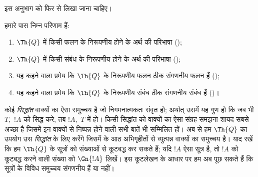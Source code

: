 \documentclass[../../../include/open-logic-section]{subfiles}
\begin{document}


\begin{editorial}
इस अनुभाग को फिर से लिखा जाना चाहिए।
\end{editorial}

हमारे पास निम्न परिणाम हैं:
\begin{enumerate}
\item $\Th{Q}$ में किसी फलन के निरूपणीय होने के अर्थ की परिभाषा
  ();
\item $\Th{Q}$ में किसी संबंध के निरूपणीय होने के अर्थ की परिभाषा
  ();
\item यह कहने वाला प्रमेय कि $\Th{Q}$ के निरूपणीय फलन ठीक संगणनीय फलन हैं
  ();
\item यह कहने वाला प्रमेय कि $\Th{Q}$ के निरूपणीय संबंध ठीक संगणनीय संबंध
  हैं ()।
\end{enumerate}

कोई {\em सिद्धांत} वाक्यों का ऐसा समुच्चय है जो निगमनात्मकतः संवृत हो;
अर्थात् उसमें यह गुण हो कि जब भी $T$,~$!A$ को सिद्ध करे, तब $!A$,~$T$ में
हो। किसी सिद्धांत को वाक्यों का ऐसा संग्रह समझना शायद सबसे अच्छा है जिसमें
इन वाक्यों से निष्पन्न होने वाली सभी बातें भी सम्मिलित हों। अब से हम
$\Th{Q}$ का उपयोग उस {\em सिद्धांत} के लिए करेंगे जिसमें
 के आठ अभिगृहीतों से व्युत्पन्न वाक्यों का समुच्चय है।
याद रखें कि हम $\Th{Q}$ के सूत्रों को संख्याओं से कूटबद्ध कर सकते हैं; यदि
$!A$ ऐसा सूत्र है, तो $!A$ को कूटबद्ध करने वाली संख्या को $\Gn{!A}$ लिखें।
इस कूटलेखन के आधार पर हम अब पूछ सकते हैं कि सूत्रों के विविध समुच्चय
संगणनीय हैं या नहीं।
\end{document}
